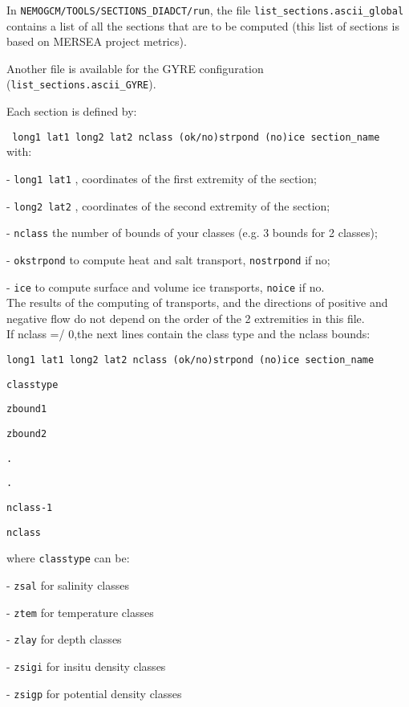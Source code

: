 \documentclass[NEMO_book]{subfiles}
\begin{document}
In \texttt{NEMOGCM/TOOLS/SECTIONS\_DIADCT/run}, the file \texttt{ {list\_sections.ascii\_global}}
contains a list of all the sections that are to be computed (this list of sections is based on MERSEA project metrics).

Another file is available for the GYRE configuration (\texttt{ {list\_sections.ascii\_GYRE}}). 

Each section is defined by:

\noindent \texttt{ long1 lat1 long2 lat2 nclass (ok/no)strpond (no)ice section\_name }\\
with:

- \texttt{long1 lat1} , coordinates of the first extremity of the section;

- \texttt{long2 lat2} , coordinates of the second extremity of the section;

- \texttt{nclass} the number of bounds of your classes (e.g. 3 bounds for 2 classes);

- \texttt{okstrpond} to compute heat and salt transport, \texttt{nostrpond} if no;

- \texttt{ice}  to compute surface and volume ice transports, \texttt{noice} if no. \\


\noindent The results of the computing of transports, and the directions of positive
 and negative flow do not depend on the order of the 2 extremities in this file.\\ 


\noindent If nclass =/ 0,the next lines contain the class type and the nclass bounds:

\texttt{long1 lat1 long2 lat2 nclass (ok/no)strpond (no)ice section\_name}

\texttt{classtype}

\texttt{zbound1}

\texttt{zbound2}

\texttt{.}

\texttt{.}

\texttt{nclass-1}

\texttt{nclass}

\noindent where \texttt{classtype} can be:

- \texttt{zsal} for salinity classes

- \texttt{ztem} for temperature classes

- \texttt{zlay} for depth classes

- \texttt{zsigi} for insitu density classes

- \texttt{zsigp} for potential density classes \\
\end{document}
